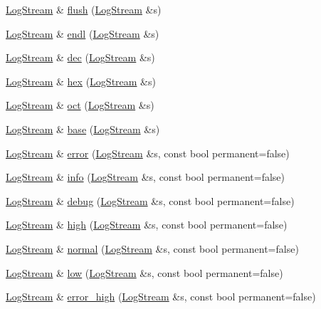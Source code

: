 \begin{DoxyCompactItemize}
\item 
\hyperlink{a00031}{Log\-Stream} \& \hyperlink{a00090_a416806b7a937a2437ffadb9b523e1cf3}{flush} (\hyperlink{a00031}{Log\-Stream} \&s)
\item 
\hyperlink{a00031}{Log\-Stream} \& \hyperlink{a00090_ad682f16cb474bc7ff2c991ad2c45db66}{endl} (\hyperlink{a00031}{Log\-Stream} \&s)
\item 
\hyperlink{a00031}{Log\-Stream} \& \hyperlink{a00090_a5d7a175caf56eafe6f39469a0b0ac034}{dec} (\hyperlink{a00031}{Log\-Stream} \&s)
\item 
\hyperlink{a00031}{Log\-Stream} \& \hyperlink{a00090_a1463e1f81c1a4a6c6e19e883f1160059}{hex} (\hyperlink{a00031}{Log\-Stream} \&s)
\item 
\hyperlink{a00031}{Log\-Stream} \& \hyperlink{a00090_a1d9bd6b119890c9396e1dce048c07032}{oct} (\hyperlink{a00031}{Log\-Stream} \&s)
\item 
\hyperlink{a00031}{Log\-Stream} \& \hyperlink{a00090_a3a365ff3909fcd0d76c2f7fa4da3b2b0}{base} (\hyperlink{a00031}{Log\-Stream} \&s)
\item 
\hyperlink{a00031}{Log\-Stream} \& \hyperlink{a00090_a53df3ad3d908fa67b2d4a73000241b4f}{error} (\hyperlink{a00031}{Log\-Stream} \&s, const bool permanent=false)
\item 
\hyperlink{a00031}{Log\-Stream} \& \hyperlink{a00090_aff72768a5e8b0486de0cecb0bd95f3e4}{info} (\hyperlink{a00031}{Log\-Stream} \&s, const bool permanent=false)
\item 
\hyperlink{a00031}{Log\-Stream} \& \hyperlink{a00090_a795be5b59b6a02e1d8f6d9d5bb41c3a4}{debug} (\hyperlink{a00031}{Log\-Stream} \&s, const bool permanent=false)
\item 
\hyperlink{a00031}{Log\-Stream} \& \hyperlink{a00090_a210331dfe6a9773c4e8e1db1e889820b}{high} (\hyperlink{a00031}{Log\-Stream} \&s, const bool permanent=false)
\item 
\hyperlink{a00031}{Log\-Stream} \& \hyperlink{a00090_a8f9aa3f28fd54225dee006e014efcf65}{normal} (\hyperlink{a00031}{Log\-Stream} \&s, const bool permanent=false)
\item 
\hyperlink{a00031}{Log\-Stream} \& \hyperlink{a00090_a934867d04be842b8f6e9df5dfa07f40e}{low} (\hyperlink{a00031}{Log\-Stream} \&s, const bool permanent=false)
\item 
\hyperlink{a00031}{Log\-Stream} \& \hyperlink{a00090_aee969aa657dcd750d102fc48a29ba516}{error\-\_\-high} (\hyperlink{a00031}{Log\-Stream} \&s, const bool permanent=false)

\end{DoxyCompactItemize}
